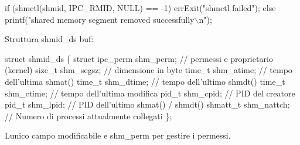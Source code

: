 \begin{DoxyCode}
\textcolor{keywordflow}{if} (shmctl(shmid, IPC\_RMID, NULL) == -1)
    errExit(\textcolor{stringliteral}{"shmctl failed"});
\textcolor{keywordflow}{else}
    printf(\textcolor{stringliteral}{"shared memory segment removed successfully\(\backslash\)n"});
\end{DoxyCode}


Struttura shmid\+\_\+ds buf\+: 
\begin{DoxyCode}
\textcolor{keyword}{struct }shmid\_ds \{
    \textcolor{keyword}{struct }ipc\_perm shm\_perm; \textcolor{comment}{// permessi e proprietario (kernel)}
    \textcolor{keywordtype}{size\_t} shm\_segsz; \textcolor{comment}{// dimensione in byte}
    time\_t shm\_atime; \textcolor{comment}{// tempo dell'ultima shmat()}
    time\_t shm\_dtime; \textcolor{comment}{// tempo dell'ultimo shmdt()}
    time\_t shm\_ctime; \textcolor{comment}{// tempo dell'ultima modifica}
    pid\_t shm\_cpid; \textcolor{comment}{// PID del creatore}
    pid\_t shm\_lpid; \textcolor{comment}{// PID dell'ultimo shmat() / shmdt()}
    shmatt\_t shm\_nattch; \textcolor{comment}{// Numero di processi attualmente collegati}
\};
\end{DoxyCode}


L\textquotesingle{}unico campo modificabile e\textquotesingle{} {\ttfamily shm\+\_\+perm} per gestire i permessi. 